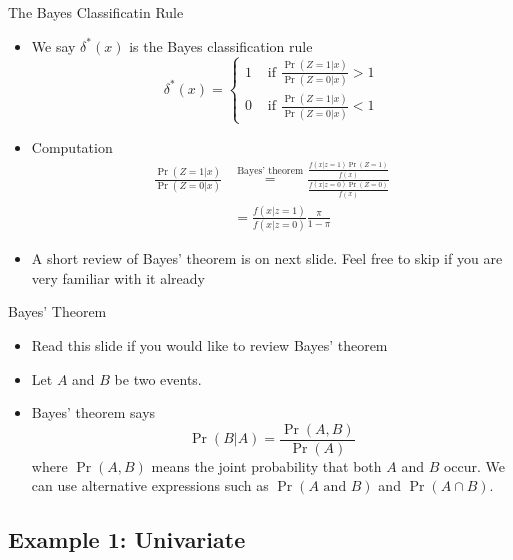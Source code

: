 \documentclass[
  ignorenonframetext,
]{beamer}
\providecommand{\tightlist}{%
  \setlength{\itemsep}{0pt}\setlength{\parskip}{0pt}}
\begin{document}
\begin{frame}{The Bayes Classificatin Rule}
\protect\hypertarget{the-bayes-classificatin-rule}{}
\begin{itemize}
\item
  We say \(\delta^*(x)\) is the Bayes classification rule
  \[\delta^*(x)=\left\{
  \begin{array}{cc}
  1 & \mbox{ if } \frac{\Pr(Z=1|x)}{\Pr(Z=0|x)}>1\\
  0 & \mbox{ if } \frac{\Pr(Z=1|x)}{\Pr(Z=0|x)}<1
  \end{array}\right.\]
\item
  Computation \[\begin{aligned}
  \frac{\Pr(Z=1|x)}{\Pr(Z=0|x)} &
   \overset{\mbox{Bayes' theorem}} = \frac{\frac{f(x|z=1)\Pr(Z=1)}{f(x)}}{\frac{f(x|z=0)\Pr(Z=0)}{f(x)}}\\
  & = \frac{f(x|z=1)}{f(x|z=0)}\frac{\pi}{1-\pi}
  \end{aligned}\]
\item
  A short review of Bayes' theorem is on next slide. Feel free to skip
  if you are very familiar with it already
\end{itemize}
\end{frame}

\begin{frame}{Bayes' Theorem}
\protect\hypertarget{bayes-theorem}{}
\begin{itemize}
\tightlist
\item
  Read this slide if you would like to review Bayes' theorem
\item
  Let \(A\) and \(B\) be two events.
\item
  Bayes' theorem says \[\Pr(B|A) = \dfrac{\Pr(A,  B)}{\Pr(A)}\] where
  \(\Pr(A,B)\) means the joint probability that both \(A\) and \(B\)
  occur. We can use alternative expressions such as
  \(\Pr(A \text{ and } B)\) and \(\Pr(A \cap B)\).
\end{itemize}
\end{frame}

\hypertarget{example-1-univariate}{%
\subsection{Example 1: Univariate}\label{example-1-univariate}}
\end{document}
